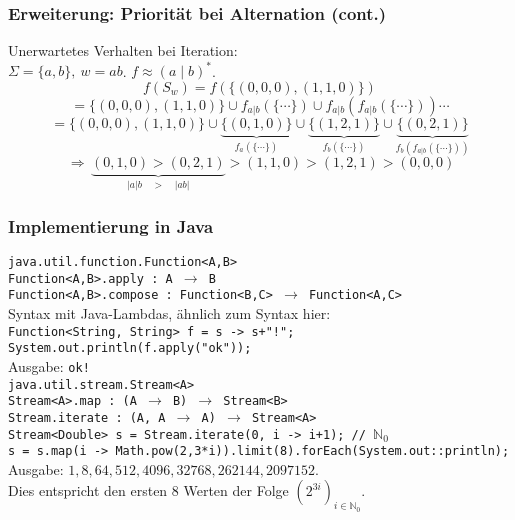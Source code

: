 \documentclass{beamer}
\begin{document}
    \begin{frame}[t]
        \frametitle{Erweiterung: Priorität bei Alternation (cont.)}
        Unerwartetes Verhalten bei Iteration:\\
        $\Sigma = \{a,b\},\ w = ab$. $f \approx (a\mid b)^*$.
        \pause
        $$
            f(S_w) = f(\{(0,0,0),(1,1,0)\})
        $$$$
            = \{(0,0,0),(1,1,0)\} \cup f_{a|b}(\{\cdots\}) \cup f_{a|b}(f_{a|b}(\{\cdots\})) \cdots
        $$$$
            = \{(0,0,0),(1,1,0)\}
            \cup \underbrace{\{(0,1,0)\}}_{f_a(\{\cdots\})}
            \cup \underbrace{\{(1,2,1)\}}_{f_b(\{\cdots\})}
            \cup \underbrace{\{(0,2,1)\}}_{f_b(f_{a|b}(\{\cdots\}))}
        $$
        \pause
        $$
            \,\Longrightarrow\, \underbrace{(0,1,0) > (0,2,1)}_{|a|b\quad >\quad |ab|} > (1,1,0) > (1,2,1) > (0,0,0)
        $$
    \end{frame}

    \begin{frame}[t]
        \frametitle{Implementierung in Java}
        {\scriptsize
            \texttt{java.util.function.Function<A,B>}\\
            \texttt{Function<A,B>.apply :\ A $\to$ B}\\
            \texttt{Function<A,B>.compose :\ Function<B,C> $\to$ Function<A,C>}\\[10pt]
            \pause
            Syntax mit Java-Lambdas, ähnlich zum Syntax hier:\\[5pt]
            \texttt{Function<String, String> f = s -> s+"!";}\\
            \texttt{System.out.println(f.apply("ok"));}\\[5pt]
            Ausgabe: \texttt{ok!}\\[10pt]
            \pause
            \texttt{java.util.stream.Stream<A>}\\
            \texttt{Stream<A>.map :\ (A $\to$ B) $\to$ Stream<B>}\\\pause
            \texttt{Stream.iterate :\ (A, A $\to$ A) $\to$ Stream<A>}\\[10pt]

            \texttt{Stream<Double> s = Stream.iterate(0, i -> i+1); // $\mathbb{N}_0$}\\
            \texttt{s = s.map(i -> Math.pow(2,3*i)).limit(8).forEach(System.out::println);}\\[5pt]
            Ausgabe: $1, 8, 64, 512, 4096, 32768, 262144, 2097152$.\\
            Dies entspricht den ersten 8 Werten der Folge $(2^{3i})_{i \in \mathbb{N}_0}$.

        }
    \end{frame}
\end{document}
